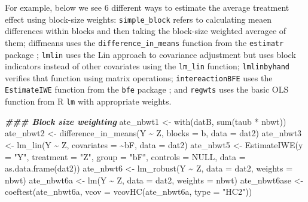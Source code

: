 \documentclass[
  12pt,
]{book}
\newenvironment{Shaded}{\begin{snugshade}}{\end{snugshade}}
\newcommand{\AttributeTok}[1]{\textcolor[rgb]{0.77,0.63,0.00}{#1}}
\newcommand{\ConstantTok}[1]{\textcolor[rgb]{0.00,0.00,0.00}{#1}}
\newcommand{\DocumentationTok}[1]{\textcolor[rgb]{0.56,0.35,0.01}{\textbf{\textit{#1}}}}
\newcommand{\FunctionTok}[1]{\textcolor[rgb]{0.00,0.00,0.00}{#1}}
\newcommand{\NormalTok}[1]{#1}
\newcommand{\OtherTok}[1]{\textcolor[rgb]{0.56,0.35,0.01}{#1}}
\newcommand{\SpecialCharTok}[1]{\textcolor[rgb]{0.00,0.00,0.00}{#1}}
\newcommand{\StringTok}[1]{\textcolor[rgb]{0.31,0.60,0.02}{#1}}
\theoremstyle{definition}
\theoremstyle{definition}
\theoremstyle{definition}
\theoremstyle{remark}
\begin{document}
For example, below we see 6 different ways to estimate the average
treatment effect using block-size weights: \texttt{simple\_block} refers
to calculating meaen differences within blocks and then taking the
block-size weighted averagee of them; diffmeans uses the
\texttt{difference\_in\_means} function from the \texttt{estimatr}
package \citep{R-estimatr}; \texttt{lmlin} uses the Lin approach to
covariance adjustment but uses block indicators instead of other
covariates using the \texttt{lm\_lin} function; \texttt{lmlinbyhand}
verifies that function using matrix operations; \texttt{intereactionBFE}
uses the \texttt{EstimateIWE} function from the \texttt{bfe} package
\citep{R-bfe}; and \texttt{regwts} uses the basic OLS function from R
\texttt{lm} with appropriate weights.

\begin{Shaded}
\begin{Highlighting}[]
\DocumentationTok{\#\#\# Block size weighting}
\NormalTok{ate\_nbwt1 }\OtherTok{\textless{}{-}} \FunctionTok{with}\NormalTok{(datB, }\FunctionTok{sum}\NormalTok{(taub }\SpecialCharTok{*}\NormalTok{ nbwt))}
\NormalTok{ate\_nbwt2 }\OtherTok{\textless{}{-}} \FunctionTok{difference\_in\_means}\NormalTok{(Y }\SpecialCharTok{\textasciitilde{}}\NormalTok{ Z, }\AttributeTok{blocks =}\NormalTok{ b, }\AttributeTok{data =}\NormalTok{ dat2)}
\NormalTok{ate\_nbwt3 }\OtherTok{\textless{}{-}} \FunctionTok{lm\_lin}\NormalTok{(Y }\SpecialCharTok{\textasciitilde{}}\NormalTok{ Z, }\AttributeTok{covariates =} \SpecialCharTok{\textasciitilde{}}\NormalTok{bF, }\AttributeTok{data =}\NormalTok{ dat2)}
\NormalTok{ate\_nbwt5 }\OtherTok{\textless{}{-}} \FunctionTok{EstimateIWE}\NormalTok{(}\AttributeTok{y =} \StringTok{"Y"}\NormalTok{, }\AttributeTok{treatment =} \StringTok{"Z"}\NormalTok{, }\AttributeTok{group =} \StringTok{"bF"}\NormalTok{, }\AttributeTok{controls =} \ConstantTok{NULL}\NormalTok{, }\AttributeTok{data =} \FunctionTok{as.data.frame}\NormalTok{(dat2))}
\NormalTok{ate\_nbwt6 }\OtherTok{\textless{}{-}} \FunctionTok{lm\_robust}\NormalTok{(Y }\SpecialCharTok{\textasciitilde{}}\NormalTok{ Z, }\AttributeTok{data =}\NormalTok{ dat2, }\AttributeTok{weights =}\NormalTok{ nbwt)}
\NormalTok{ate\_nbwt6a }\OtherTok{\textless{}{-}} \FunctionTok{lm}\NormalTok{(Y }\SpecialCharTok{\textasciitilde{}}\NormalTok{ Z, }\AttributeTok{data =}\NormalTok{ dat2, }\AttributeTok{weights =}\NormalTok{ nbwt)}
\NormalTok{ate\_nbwt6ase }\OtherTok{\textless{}{-}} \FunctionTok{coeftest}\NormalTok{(ate\_nbwt6a, }\AttributeTok{vcov =} \FunctionTok{vcovHC}\NormalTok{(ate\_nbwt6a, }\AttributeTok{type =} \StringTok{"HC2"}\NormalTok{))}


\end{Highlighting}
\end{Shaded}
\end{document}
